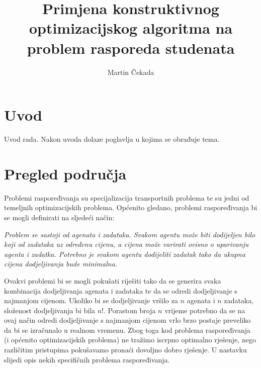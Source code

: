 \documentclass[times, utf8, zavrsni]{fer}
\begin{document}

\title{Primjena konstruktivnog optimizacijskog algoritma na problem
rasporeda studenata}

\author{Martin Čekada}

\maketitle

\izvornik

\zahvala{}

\tableofcontents

\chapter{Uvod}
Uvod rada. Nakon uvoda dolaze poglavlja u kojima se obrađuje tema.

\chapter{Pregled područja}
Problemi raspoređivanja su specijalizacija transportnih problema te su jedni od temeljnih optimizacijskih problema.
Općenito gledano, problemi raspoređivanja bi se mogli definirati na sljedeći način:
\begin{framed}
\emph{Problem se sastoji od agenata i zadataka. Svakom agentu može biti dodijeljen bilo koji od zadataka uz određenu cijenu, a cijena
može varirati ovisno o uparivanju agenta i zadatka. Potrebno je svakom agentu dodijeliti zadatak tako da ukupna cijena dodjeljivanja
bude minimalna.}
\end{framed}

Ovakvi problemi bi se mogli pokušati riješiti tako da se generira svaka kombinacija dodjeljivanja agenata i zadataka te da se
odredi dodjeljivanje s najmanjom cijenom. Ukoliko bi se dodjeljivanje vršilo za $n$ agenata i $n$ zadataka, složenost dodjeljivanja bi bila $n!$. Porastom broja $n$ vrijeme potrebno da se na ovaj način odredi dodjeljivanje s najmanjom cijenom vrlo brzo postaje preveliko da bi se izračunalo u realnom vremenu. Zbog toga kod problema raspoređivanja (i općenito optimizacijskih problema) ne tražimo iscrpno optimalno rješenje, nego različitim pristupima pokušavamo pronaći dovoljno dobro rješenje. U nastavku slijedi opis nekih specifičnih problema raspoređivanja.
\end{document}
